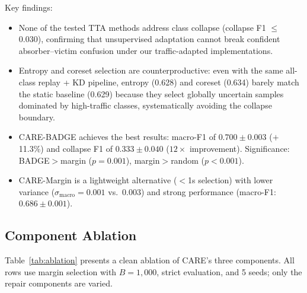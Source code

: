 \documentclass[journal]{IEEEtran}
\newcommand{\ours}{CARE}  %
\begin{document}
Key findings:
\begin{itemize}
  \item None of the tested TTA methods address class collapse (collapse F1 $\leq$0.030), confirming that unsupervised adaptation cannot break confident absorber--victim confusion under our traffic-adapted implementations.
  \item Entropy and coreset selection are counterproductive: even with the same all-class replay + KD pipeline, entropy (0.628) and coreset (0.634) barely match the static baseline (0.629) because they select globally uncertain samples dominated by high-traffic classes, systematically avoiding the collapse boundary.
  \item \ours{}-BADGE achieves the best results: macro-F1 of $0.700{\pm}0.003$ ($+$11.3\%) and collapse F1 of $0.333{\pm}0.040$ ($12{\times}$ improvement). Significance: BADGE$>$margin ($p{=}0.001$), margin$>$random ($p{<}0.001$).
  \item \ours{}-Margin is a lightweight alternative ($<$1s selection) with lower variance ($\sigma_{\text{macro}}{=}0.001$ vs.\ 0.003) and strong performance (macro-F1: $0.686{\pm}0.001$).
\end{itemize}

\subsection{Component Ablation}
\label{sec:ablation}

Table~\ref{tab:ablation} presents a clean ablation of \ours{}'s three components.
All rows use margin selection with $B{=}1{,}000$, strict evaluation, and 5 seeds; only the repair components are varied.
\end{document}
